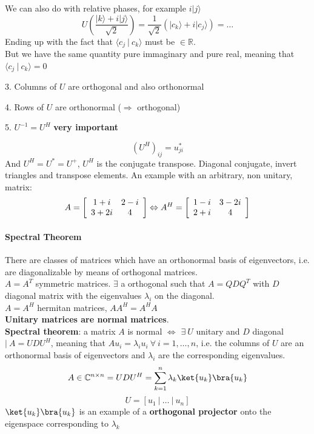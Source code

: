 \documentclass[10pt]{report}
\begin{document}
We can also do with relative phases, for example $i|j\rangle$ $$U\left(\frac{|k\rangle + i|j\rangle}{\sqrt{2}}\right) = \frac{1}{\sqrt{2}}\left(|c_k\rangle + i|c_j\rangle\right) = \ldots$$
Ending up with the fact that $\langle c_j\:|\:c_k\rangle$ must be $\in \mathbb{R}$.\\
But we have the same quantity pure immaginary and pure real, meaning that $\langle c_j\:|\:c_k\rangle = 0$
\begin{list}{}{}
	\item[3.] Columns of $U$ are orthogonal and also orthonormal
	\item[4.] Rows of $U$ are orthonormal ($\Rightarrow$ orthogonal)
	\item[5.] $U^{-1} = U^H$ \textbf{very important}
\end{list}
$$(U^H)_{ij} = u^*_{ji}$$
And $U^H = U^* =U ^+$, $U^H$ is the conjugate transpose. Diagonal conjugate, invert triangles and transpose elements. An example with an arbitrary, non unitary, matrix:
$$A=\left[\begin{array}{c c}
1+i&2-i\\3+2i&4
\end{array}\right]\Leftrightarrow A^H=\left[\begin{array}{c c}
1-i & 3-2i\\2+i&4
\end{array}\right]$$
\paragraph{Spectral Theorem} There are classes of matrices which have an orthonormal basis of eigenvectors, i.e. are diagonalizable by means of orthogonal matrices.\\
$A = A^T$ symmetric matrices. $\exists$ a orthogonal such that $A = QDQ^T$ with $D$ diagonal matrix with the eigenvalues $\lambda_i$ on the diagonal.\\
$A = A^H$ hermitan matrices, $AA^H = A^HA$\\
\textbf{Unitary matrices are normal matrices}.\\
\textbf{Spectral theorem}: a matrix $A$ is normal $\Leftrightarrow$ $\exists\:U$ unitary and $D$ diagonal $|\:A=UDU^H$, meaning that $Au_i = \lambda_iu_i\:\forall\:i=1,\ldots,n$, i.e. the columns of $U$ are an orthonormal basis of eigenvectors and $\lambda_i$ are the corresponding eigenvalues.
$$A \in \mathbb{C}^{n\times n} = UDU^H = \sum_{k=1}^n\lambda_k\ket{u_k}\bra{u_k} $$
$$U = [u_1\:|\:\ldots\:|\:u_n]$$
$\ket{u_k}\bra{u_k}$ is an example of a \textbf{orthogonal projector} onto the eigenspace corresponding to $\lambda_k$
\end{document}
